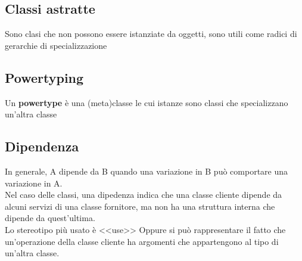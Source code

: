 \documentclass{report}
\begin{document}
            \subsection{Classi astratte}
                Sono clasi che non possono essere istanziate da oggetti, sono utili come radici di gerarchie di specializzazione
            \subsection{Powertyping}
                Un \textbf{powertype} è una (meta)classe le cui istanze sono classi che specializzano un'altra classe 
            \subsection{Dipendenza}
                In generale, A dipende da B quando una variazione in B può comportare una variazione in A.
                \\
                Nel caso delle classi, una dipedenza indica che una classe cliente dipende da alcuni servizi di una classe fornitore, ma non ha una struttura interna che dipende da quest'ultima.
                \\
                Lo stereotipo più usato è <<use>> 
                Oppure si può rappresentare il fatto che un'operazione della classe cliente ha argomenti che appartengono al tipo di un'altra classe.
            
                
\end{document}
